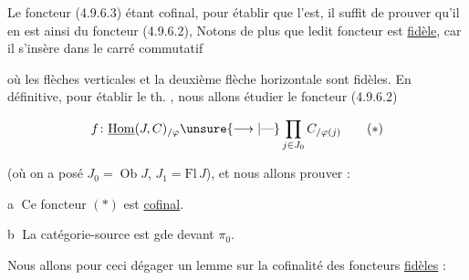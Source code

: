 
Le foncteur (4.9.6.3) étant cofinal, pour établir que  l'est, il suffit de prouver qu'il en est ainsi du foncteur (4.9.6.2),  Notons de plus que ledit foncteur est \uline{fidèle}, car il s'insère dans le carré commutatif


où les flèches verticales et la deuxième flèche horizontale sont fidèles.   En définitive, pour établir le th. , nous allons étudier le foncteur  (4.9.6.2)

\[
f\colon\underline{\operatorname{Hom}}(J,C)_{/\varphi}\unsure{\longrightarrow|\text{---}}\prod_{j\in J_0}C_{/\varphi(j)}\tag*{($\ast$)}
\]

(où on a posé $J_0=\operatorname{Ob}J$, $J_1=\mathrm{Fl}\,J$), et  nous allons prouver :

\textcircled{a} Ce foncteur  $(\ast)$ est \uline{cofinal}.

\textcircled{b} La catégorie-source  est gde devant $\pi_0$.

Nous allons pour ceci dégager un lemme  sur la cofinalité des foncteurs \uline{fidèles} :
